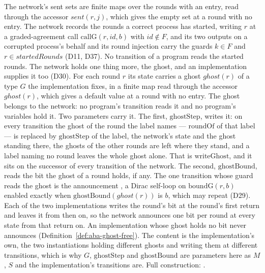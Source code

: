 \begin{definition}
  The network's sent sets are finite maps over the rounds with an entry, read through the accessor $\mathit{sent}(r,j)$, which gives the empty set at a round with no entry.
  The network records the rounds a correct process has started, writing $r$ at a graded-agreement call $\mathrm{callG}(r,id,b)$ with $id \notin F$, and its two outputs on a corrupted process's behalf and its round injection carry the guards $k \in F$ and $r \in \mathit{startedRounds}$ (D11, D37).
  No transition of a program reads the started rounds.
  The network holds one thing more, the ghost, and an implementation supplies it too (D30).
  For each round $r$ its state carries a ghost $ghost(r)$ of a type $G$ the implementation fixes, in a finite map read through the accessor $ghost(r)$, which gives a default value at a round with no entry.
  The ghost belongs to the network: no program's transition reads it and no program's variables hold it.
  Two parameters carry it.
  The first, $\mathrm{ghostStep}$, writes it: on every transition the ghost of the round the label names --- $\mathrm{roundOf}$ of that label --- is replaced by $\mathrm{ghostStep}$ of the label, the network's state and the ghost standing there, the ghosts of the other rounds are left where they stand, and a label naming no round leaves the whole ghost alone.
  That is $\mathrm{writeGhost}$, and it sits on the successor of every transition of the network.
  The second, $\mathrm{ghostBound}$, reads the bit the ghost of a round holds, if any.
  The one transition whose guard reads the ghost is the announcement , a Dirac self-loop on $\mathrm{boundG}(r,b)$ enabled exactly when $\mathrm{ghostBound}(ghost(r))$ is $b$, which may repeat (D29).
  Each of the two implementations writes the round's bit at the round's first return and leaves it from then on, so the network announces one bit per round at every state from that return on.
  An implementation whose ghost holds no bit never announces (Definition~\ref{def:aba-ghost-free}).
  The content is the implementation's own, the two instantiations holding different ghosts and writing them at different transitions, which is why $G$, $\mathrm{ghostStep}$ and $\mathrm{ghostBound}$ are parameters here as $M$, $S$ and the implementation's transitions are.
  Full construction: .
\end{definition}

